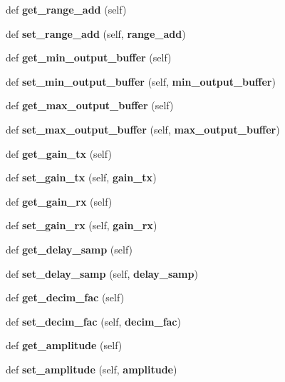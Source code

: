 \begin{DoxyCompactItemize}
def {\bf get\+\_\+range\+\_\+add} (self)
\item 
def {\bf set\+\_\+range\+\_\+add} (self, {\bf range\+\_\+add})
\item 
def {\bf get\+\_\+min\+\_\+output\+\_\+buffer} (self)
\item 
def {\bf set\+\_\+min\+\_\+output\+\_\+buffer} (self, {\bf min\+\_\+output\+\_\+buffer})
\item 
def {\bf get\+\_\+max\+\_\+output\+\_\+buffer} (self)
\item 
def {\bf set\+\_\+max\+\_\+output\+\_\+buffer} (self, {\bf max\+\_\+output\+\_\+buffer})
\item 
def {\bf get\+\_\+gain\+\_\+tx} (self)
\item 
def {\bf set\+\_\+gain\+\_\+tx} (self, {\bf gain\+\_\+tx})
\item 
def {\bf get\+\_\+gain\+\_\+rx} (self)
\item 
def {\bf set\+\_\+gain\+\_\+rx} (self, {\bf gain\+\_\+rx})
\item 
def {\bf get\+\_\+delay\+\_\+samp} (self)
\item 
def {\bf set\+\_\+delay\+\_\+samp} (self, {\bf delay\+\_\+samp})
\item 
def {\bf get\+\_\+decim\+\_\+fac} (self)
\item 
def {\bf set\+\_\+decim\+\_\+fac} (self, {\bf decim\+\_\+fac})
\item 
def {\bf get\+\_\+amplitude} (self)
\item 
def {\bf set\+\_\+amplitude} (self, {\bf amplitude})
\end{DoxyCompactItemize}
